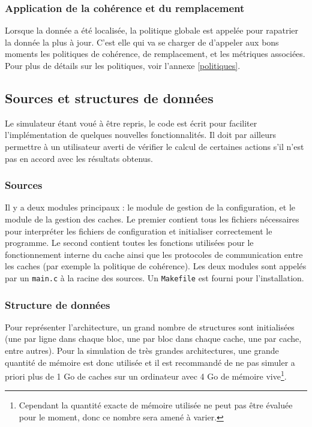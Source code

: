 \subsubsection{Application de la cohérence et du remplacement}

 Lorsque la donnée a été localisée, la politique globale est appelée pour rapatrier la donnée la plus à jour. C'est elle qui va se charger de d'appeler aux bons moments les politiques de cohérence, de remplacement, et les métriques associées. Pour plus de détails sur les politiques, voir l'annexe \ref{politiques}.

\subsection{Sources et structures de données}

Le simulateur étant voué à être repris, le code est écrit pour faciliter l'implémentation de quelques nouvelles fonctionnalités. Il doit par ailleurs permettre à un utilisateur averti de vérifier le calcul de certaines actions s'il n'est pas en accord avec les résultats obtenus.

\subsubsection{Sources}

Il y a deux modules principaux : le module de gestion de la configuration, et le module de la gestion des caches. Le premier contient tous les fichiers nécessaires pour interpréter les fichiers de configuration et initialiser correctement le programme. Le second contient toutes les fonctions utilisées pour le fonctionnement interne du cache ainsi que les protocoles de communication entre les caches (par exemple la politique de cohérence). Les deux modules sont appelés par un \verb!main.c! à la racine des sources. Un \verb!Makefile! est fourni pour l'installation.

\subsubsection{Structure de données}

Pour représenter l'architecture, un grand nombre de structures sont initialisées (une par ligne dans chaque bloc, une par bloc dans chaque cache, une par cache, entre autres). Pour la simulation de très grandes architectures, une grande quantité de mémoire est donc utilisée et il est recommandé de ne pas simuler a priori plus de 1 Go de caches sur un ordinateur avec 4 Go de mémoire vive\footnote{Cependant la quantité exacte de mémoire utilisée ne peut pas être évaluée pour le moment, donc ce nombre sera amené à varier.}.

